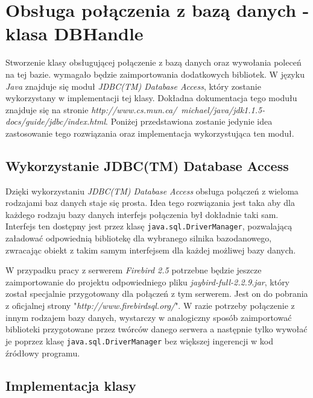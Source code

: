 \section{Obsługa połączenia z bazą danych - klasa DBHandle}

Stworzenie klasy obsługującej połączenie z bazą danych oraz wywołania poleceń na tej bazie. wymagało będzie zaimportowania dodatkowych bibliotek. W języku \emph{Java} znajduje się moduł \emph{ JDBC(TM) Database Access}, który zostanie wykorzystany w implementacji tej klasy. Dokładna dokumentacja tego modułu znajduje się na stronie \emph{http://www.cs.mun.ca/~michael/java/jdk1.1.5-docs/guide/jdbc/index.html}. Poniżej przedstawiona zostanie jedynie idea zastosowanie tego rozwiązania oraz implementacja wykorzystująca ten moduł.
\subsection{Wykorzystanie JDBC(TM) Database Access}

Dzięki wykorzystaniu \emph{ JDBC(TM) Database Access} obsługa połączeń z wieloma rodzajami baz danych staje się prosta. Idea tego rozwiązania jest taka aby dla każdego rodzaju bazy danych interfejs połączenia był dokładnie taki sam. Interfejs ten dostępny jest przez klasę \texttt{java.sql.DriverManager}, pozwalającą załadować odpowiednią bibliotekę dla wybranego silnika bazodanowego, zwracając obiekt z takim samym interfejsem dla każdej możliwej bazy danych. 
\par
W przypadku pracy z serwerem \emph{Firebird 2.5} potrzebne będzie jeszcze zaimportowanie do projektu odpowiedniego pliku \emph{jaybird-full-2.2.9.jar}, który został specjalnie przygotowany dla połączeń z tym serwerem. Jest on do pobrania z oficjalnej strony "\emph{http://www.firebirdsql.org/}". W razie potrzeby połączenie z innym rodzajem bazy danych, wystarczy w analogiczny sposób zaimportować biblioteki przygotowane przez twórców danego serwera a następnie tylko wywołać je poprzez klasę \texttt{java.sql.DriverManager} bez większej ingerencji w kod źródłowy programu.

\subsection{Implementacja klasy}

